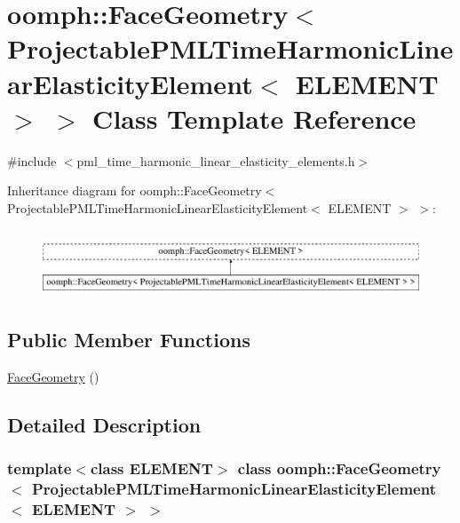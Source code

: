 \hypertarget{classoomph_1_1FaceGeometry_3_01ProjectablePMLTimeHarmonicLinearElasticityElement_3_01ELEMENT_01_4_01_4}{}\section{oomph\+:\+:Face\+Geometry$<$ Projectable\+P\+M\+L\+Time\+Harmonic\+Linear\+Elasticity\+Element$<$ E\+L\+E\+M\+E\+NT $>$ $>$ Class Template Reference}
\label{classoomph_1_1FaceGeometry_3_01ProjectablePMLTimeHarmonicLinearElasticityElement_3_01ELEMENT_01_4_01_4}


{\ttfamily \#include $<$pml\+\_\+time\+\_\+harmonic\+\_\+linear\+\_\+elasticity\+\_\+elements.\+h$>$}

Inheritance diagram for oomph\+:\+:Face\+Geometry$<$ Projectable\+P\+M\+L\+Time\+Harmonic\+Linear\+Elasticity\+Element$<$ E\+L\+E\+M\+E\+NT $>$ $>$\+:\begin{figure}[H]
\begin{center}
\leavevmode
\includegraphics[height=2.000000cm]{classoomph_1_1FaceGeometry_3_01ProjectablePMLTimeHarmonicLinearElasticityElement_3_01ELEMENT_01_4_01_4}
\end{center}
\end{figure}
\subsection*{Public Member Functions}
\begin{DoxyCompactItemize}
\item 
\hyperlink{classoomph_1_1FaceGeometry_3_01ProjectablePMLTimeHarmonicLinearElasticityElement_3_01ELEMENT_01_4_01_4_a82ef9329a09966cbfdd2271ea9a9b282}{Face\+Geometry} ()
\end{DoxyCompactItemize}


\subsection{Detailed Description}
\subsubsection*{template$<$class E\+L\+E\+M\+E\+NT$>$\newline
class oomph\+::\+Face\+Geometry$<$ Projectable\+P\+M\+L\+Time\+Harmonic\+Linear\+Elasticity\+Element$<$ E\+L\+E\+M\+E\+N\+T $>$ $>$}

